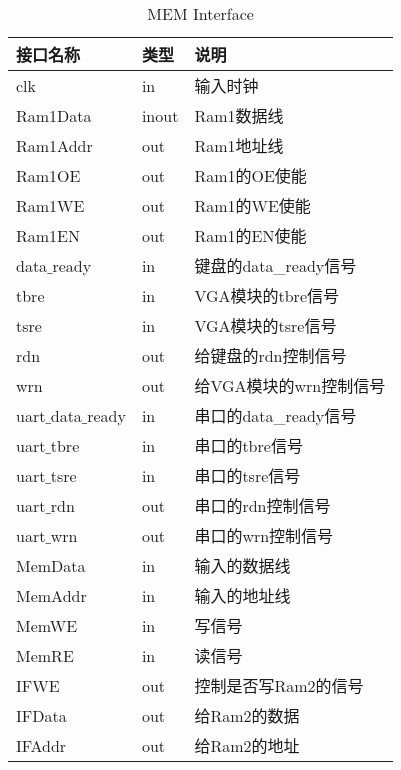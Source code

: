 \begin{center}
\renewcommand{\arraystretch}{1.3}
\small
\begin{longtable}{|p{3cm}<{\centering}|p{1.4cm}<{\centering}|p{7cm}<{\centering}|}
\caption{MEM Interface}
\label{tab:treatments}\\
\hline
接口名称 & 类型 & 说明 \\
\hline
clk & in & 输入时钟\\
\hline
Ram1Data & inout & Ram1数据线 \\
\hline
Ram1Addr & out & Ram1地址线 \\
\hline
Ram1OE & out & Ram1的OE使能\\
\hline
Ram1WE & out & Ram1的WE使能 \\
\hline
Ram1EN & out & Ram1的EN使能 \\
\hline
data$\_$ready & in & 键盘的data\_ready信号 \\
\hline
tbre & in & VGA模块的tbre信号 \\
\hline
tsre & in & VGA模块的tsre信号 \\
\hline
rdn & out &  给键盘的rdn控制信号 \\
\hline
wrn & out & 给VGA模块的wrn控制信号 \\
\hline
uart$\_$data$\_$ready & in & 串口的data\_ready信号 \\
\hline
uart$\_$tbre & in & 串口的tbre信号 \\
\hline
uart$\_$tsre & in & 串口的tsre信号 \\
\hline
uart$\_$rdn & out & 串口的rdn控制信号 \\
\hline
uart$\_$wrn & out & 串口的wrn控制信号 \\
\hline
MemData & in & 输入的数据线\\
\hline
MemAddr & in & 输入的地址线\\
\hline
MemWE & in & 写信号\\
\hline
MemRE & in & 读信号\\
\hline
IFWE & out & 控制是否写Ram2的信号\\
\hline 
IFData & out & 给Ram2的数据\\
\hline
IFAddr & out & 给Ram2的地址\\
\hline
\end{longtable}
\end{center}



